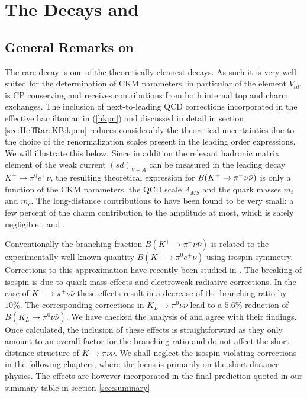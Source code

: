 \section{The Decays \kpnn and \klpnn}
\label{sec:Kpnn}
\subsection{General Remarks on \kpnn}
\label{sec:Kpnn:GeneralKp}
The rare decay \kpnn is one of the theoretically cleanest decays.
As such it is very well suited for the determination of CKM
parameters, in particular of the element $V_{td}$. \kpnn is CP
conserving and receives contributions from both internal top and
charm exchanges. The inclusion of next-to-leading QCD corrections
incorporated in the effective hamiltonian in (\ref{hkpn}) and
discussed in detail in section \ref{sec:HeffRareKB:kpnn} reduces
considerably the theoretical uncertainties due to the choice of the
renormalization scales present in the leading order expressions.
We will illustrate this below. Since in addition the relevant hadronic
matrix element of the weak current $(\bar sd)_{V-A}$ can be measured
in the leading decay $K^+\to\pi^0e^+\nu$, the resulting theoretical
expression for $B(K^+ \to \pi^+\nu\bar\nu)$ is only a function of the CKM parameters, the
QCD scale $\Lambda_{\overline{MS}}$ and the quark masses $m_t$ and
$m_c$. The long-distance contributions to \kpnn have been found to be
very small: a few percent of the charm contribution to the amplitude at
most, which is safely negligible \cite{reinsehgal:89},
\cite{hagelinlittenberg:89} and \cite{luwise:94}.

Conventionally the branching fraction $B(K^+\to\pi^+\nu\bar\nu)$ is
related to the experimentally well known quantity
$B(K^+\to\pi^0e^+\nu)$ using isospin symmetry. Corrections to this
approximation have recently been studied in \cite{marcianoparsa:95}.
The breaking of isospin is due to quark mass effects and electroweak
radiative corrections.  In the case of $K^+\to\pi^+\nu\bar\nu$ these
effects result in a decrease of the branching ratio by $10\%$. The
corresponding corrections in $K_L\to\pi^0\nu\bar\nu$ lead to a $5.6\%$
reduction of $B(K_L\to\pi^0\nu\bar\nu)$. We have checked the analysis
of \cite{marcianoparsa:95} and agree with their findings.  Once
calculated, the inclusion of these effects is straightforward as they
only amount to an overall factor for the branching ratio and do not
affect the short-distance structure of $K\to\pi\nu\bar\nu$.  We shall
neglect the isospin violating corrections in the following chapters,
where the focus is primarily on the short-distance physics. The effects
are however incorporated in the final prediction quoted in our summary
table in section \ref{sec:summary}.


